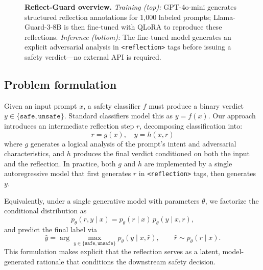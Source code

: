 \documentclass[11pt]{article}
\begin{document}
\begin{figure}[t]
\caption{
\textbf{Reflect-Guard overview.}
\textit{Training (top):} GPT-4o-mini generates structured reflection annotations for 1{,}000 labeled prompts; Llama-Guard-3-8B is then fine-tuned with QLoRA to reproduce these reflections.
\textit{Inference (bottom):} The fine-tuned model generates an explicit adversarial analysis in \texttt{<reflection>} tags before issuing a safety verdict—no external API is required.
}
\label{fig:pipeline}
\end{figure}

\subsection{Problem formulation}

Given an input prompt $x$, a safety classifier $f$ must produce a binary verdict $y \in \{\texttt{safe}, \texttt{unsafe}\}$. Standard classifiers model this as $y = f(x)$. Our approach introduces an intermediate reflection step $r$, decomposing classification into:
\begin{equation}
  r = g(x), \quad y = h(x, r)
\end{equation}
where $g$ generates a logical analysis of the prompt's intent and adversarial characteristics, and $h$ produces the final verdict conditioned on both the input and the reflection. In practice, both $g$ and $h$ are implemented by a single autoregressive model that first generates $r$ in \texttt{<reflection>} tags, then generates $y$.

Equivalently, under a single generative model with parameters $\theta$, we factorize the conditional distribution as
\begin{equation}
  p_{\theta}(r, y \mid x) = p_{\theta}(r \mid x) \, p_{\theta}(y \mid x, r),
\end{equation}
and predict the final label via
\begin{equation}
  \hat{y} = \arg\max_{y \in \{\texttt{safe},\texttt{unsafe}\}} p_{\theta}(y \mid x, \hat{r}),
  \qquad \hat{r} \sim p_{\theta}(r \mid x).
\end{equation}
This formulation makes explicit that the reflection serves as a latent, model-generated rationale that conditions the downstream safety decision.
\end{document}
